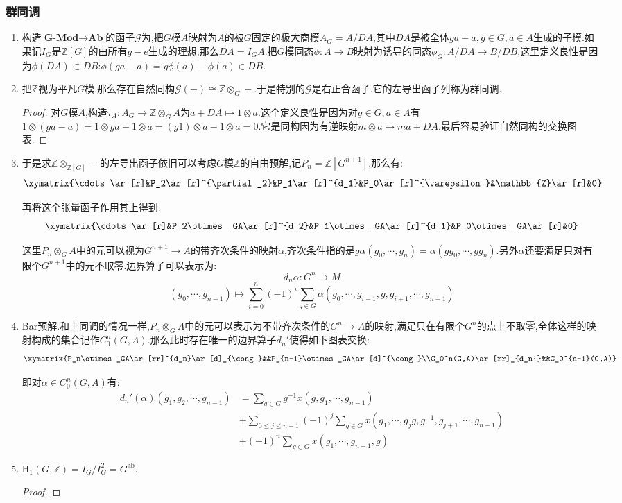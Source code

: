 \subsubsection{群同调}
\begin{enumerate}
	\item 构造$\textbf{G-Mod}\to\textbf{Ab}$的函子$\mathscr{G}$为,把$G$模$A$映射为$A$的被$G$固定的极大商模$A_G=A/DA$,其中$DA$是被全体$ga-a,g\in G,a\in A$生成的子模.如果记$I_G$是$\mathbb{Z}[G]$的由所有$g-e$生成的理想,那么$DA=I_GA$.把$G$模同态$\phi:A\to B$映射为诱导的同态$\phi_G:A/DA\to B/DB$,这里定义良性是因为$\phi(DA)\subset DB$:$\phi(ga-a)=g\phi(a)-\phi(a)\in DB$.
	\item 把$\mathbb{Z}$视为平凡$G$模,那么存在自然同构$\mathscr{G}(-)\cong\mathbb{Z}\otimes_G-$.于是特别的$\mathscr{G}$是右正合函子.它的左导出函子列称为群同调.
	\begin{proof}
		
		对$G$模$A$,构造$\tau_A:A_G\to\mathbb{Z}\otimes_GA$为$a+DA\mapsto1\otimes a$.这个定义良性是因为对$g\in G,a\in A$有$1\otimes(ga-a)=1\otimes ga-1\otimes a=(g1)\otimes a-1\otimes a=0$.它是同构因为有逆映射$m\otimes a\mapsto ma+DA$.最后容易验证自然同构的交换图表.
	\end{proof}
	\item 于是求$\mathbb{Z}\otimes_{\mathbb{Z}[G]}-$的左导出函子依旧可以考虑$G$模$\mathbb{Z}$的自由预解,记$P_n=\mathbb{Z}[G^{n+1}]$,那么有:
	$$\xymatrix{\cdots\ar[r]&P_2\ar[r]^{\partial_2}&P_1\ar[r]^{d_1}&P_0\ar[r]^{\varepsilon}&\mathbb{Z}\ar[r]&0}$$
	
	再将这个张量函子作用其上得到:
	$$\xymatrix{\cdots\ar[r]&P_2\otimes_GA\ar[r]^{d_2}&P_1\otimes_GA\ar[r]^{d_1}&P_0\otimes_GA\ar[r]&0}$$
	
	这里$P_n\otimes_GA$中的元可以视为$G^{n+1}\to A$的带齐次条件的映射$\alpha$,齐次条件指的是$g\alpha(g_0,\cdots,g_n)=\alpha(gg_0,\cdots,gg_n)$.另外$\alpha$还要满足只对有限个$G^{n+1}$中的元不取零.边界算子可以表示为:
	$$d_n\alpha:G^n\to M$$
	$$(g_0,\cdots,g_{n-1})\mapsto\sum_{i=0}^n(-1)^i\sum_{g\in G}\alpha(g_0,\cdots,g_{i-1},g,g_{i+1},\cdots,g_{n-1})$$
	\item Bar预解.和上同调的情况一样,$P_n\otimes_GA$中的元可以表示为不带齐次条件的$G^n\to A$的映射,满足只在有限个$G^n$的点上不取零,全体这样的映射构成的集合记作$C_0^n(G,A)$.那么此时存在唯一的边界算子$d_n'$使得如下图表交换:
	$$\xymatrix{P_n\otimes_GA\ar[rr]^{d_n}\ar[d]_{\cong}&&P_{n-1}\otimes_GA\ar[d]^{\cong}\\C_0^n(G,A)\ar[rr]_{d_n'}&&C_0^{n-1}(G,A)}$$
	
	即对$\alpha\in C_0^n(G,A)$有:
	\begin{align*}
		d_n'(\alpha)(g_1,g_2,\cdots,g_{n-1})&=\sum_{g\in G}g^{-1}x(g,g_1,\cdots,g_{n-1})\\&+\sum_{0\le j\le n-1}(-1)^j\sum_{g\in G}x(g_1,\cdots,g_jg,g^{-1},g_{j+1},\cdots,g_{n-1})\\&+(-1)^n\sum_{g\in G}x(g_1,\cdots,g_{n-1},g)
	\end{align*}
	\item $\mathrm{H}_1(G,\mathbb{Z})=I_G/I_G^2=G^{\mathrm{ab}}$.
	\begin{proof}
		

\end{proof}
\end{enumerate}
